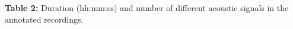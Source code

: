 \documentclass[11pt]{article}
\begin{document}
\begin{table}[h]
    \centering
    \caption*{\textbf{Table 2:} Duration (hh:mm:ss) and number of different acoustic signals in the annotated recordings.}
    \small
    
\end{table}
\end{document}
